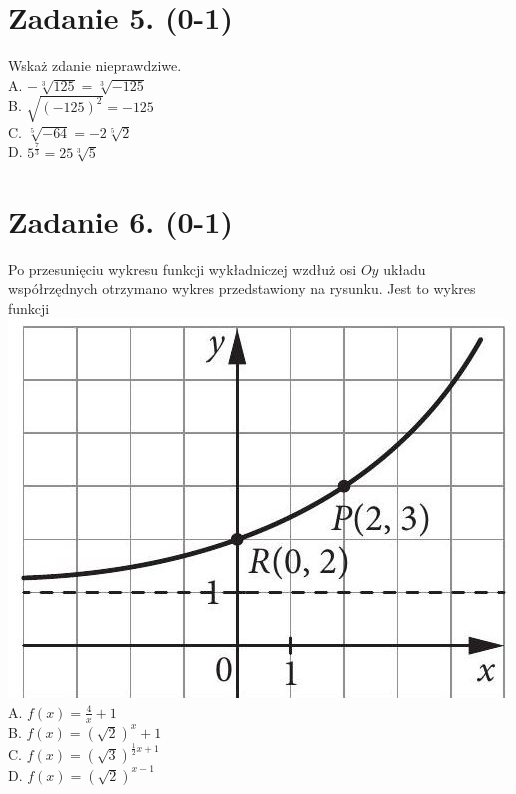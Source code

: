 \documentclass[10pt]{article}
\begin{document}
\section*{Zadanie 5. (0-1)}
Wskaż zdanie nieprawdziwe.\\
A. \(-\sqrt[3]{125}=\sqrt[3]{-125}\)\\
B. \(\sqrt{(-125)^{2}}=-125\)\\
C. \(\sqrt[5]{-64}=-2 \sqrt[5]{2}\)\\
D. \(5^{\frac{7}{3}}=25 \sqrt[3]{5}\)

\section*{Zadanie 6. (0-1)}
Po przesunięciu wykresu funkcji wykładniczej wzdłuż osi \(O y\) układu współrzędnych otrzymano wykres przedstawiony na rysunku. Jest to wykres funkcji\\
\includegraphics[max width=\textwidth, center]{2024_11_21_4a1915d79134dda0750eg-02}\\
A. \(f(x)=\frac{4}{x}+1\)\\
B. \(f(x)=(\sqrt{2})^{x}+1\)\\
C. \(f(x)=(\sqrt{3})^{\frac{1}{2} x+1}\)\\
D. \(f(x)=(\sqrt{2})^{x-1}\)
\end{document}
